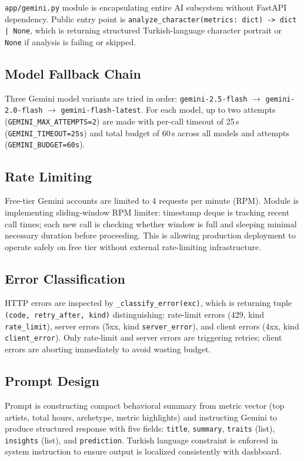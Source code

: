 \documentclass[conference]{IEEEtran}
\begin{document}
\texttt{app/gemini.py} module is encapsulating entire AI subsystem without FastAPI dependency. Public entry point is \texttt{analyze\_character(metrics: dict) -> dict | None}, which is returning structured Turkish-language character portrait or \texttt{None} if analysis is failing or skipped.

\subsection{Model Fallback Chain}

Three Gemini model variants are tried in order: \texttt{gemini-2.5-flash} $\to$ \texttt{gemini-2.0-flash} $\to$ \texttt{gemini-flash-latest}. For each model, up to two attempts (\texttt{GEMINI\_MAX\_ATTEMPTS=2}) are made with per-call timeout of 25\,s (\texttt{GEMINI\_TIMEOUT=25s}) and total budget of 60\,s across all models and attempts (\texttt{GEMINI\_BUDGET=60s}).

\subsection{Rate Limiting}

Free-tier Gemini accounts are limited to 4 requests per minute (RPM). Module is implementing sliding-window RPM limiter: timestamp deque is tracking recent call times; each new call is checking whether window is full and sleeping minimal necessary duration before proceeding. This is allowing production deployment to operate safely on free tier without external rate-limiting infrastructure.

\subsection{Error Classification}

HTTP errors are inspected by \texttt{\_classify\_error(exc)}, which is returning tuple \texttt{(code, retry\_after, kind)} distinguishing: rate-limit errors (429, kind \texttt{rate\_limit}), server errors (5xx, kind \texttt{server\_error}), and client errors (4xx, kind \texttt{client\_error}). Only rate-limit and server errors are triggering retries; client errors are aborting immediately to avoid wasting budget.

\subsection{Prompt Design}

Prompt is constructing compact behavioral summary from metric vector (top artists, total hours, archetype, metric highlights) and instructing Gemini to produce structured response with five fields: \texttt{title}, \texttt{summary}, \texttt{traits} (list), \texttt{insights} (list), and \texttt{prediction}. Turkish language constraint is enforced in system instruction to ensure output is localized consistently with dashboard.
\end{document}
